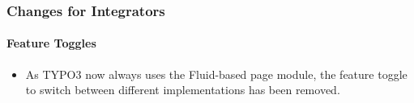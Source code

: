 %

\begin{frame}[fragile]
	\frametitle{Changes for Integrators}
	\framesubtitle{Feature Toggles}

	\begin{itemize}
		\item As TYPO3 now always uses the Fluid-based page module, the feature
			toggle to switch between different implementations has been removed.
	\end{itemize}

\end{frame}

